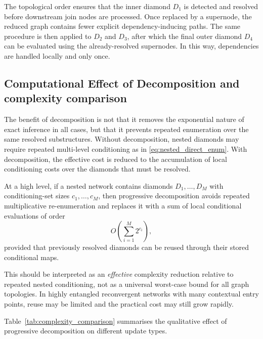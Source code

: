 \documentclass[preprint,12pt]{elsarticle}
\begin{document}
The topological order ensures that the inner diamond $D_1$ is detected and resolved before downstream join nodes are processed. Once replaced by a supernode, the reduced graph contains fewer explicit dependency-inducing paths. The same procedure is then applied to $D_2$ and $D_3$, after which the final outer diamond $D_4$ can be evaluated using the already-resolved supernodes. In this way, dependencies are handled locally and only once.

\subsection{Computational Effect of Decomposition and complexity comparison}

The benefit of decomposition is not that it removes the exponential nature of exact inference in all cases, but that it prevents repeated enumeration over the same resolved substructures. Without decomposition, nested diamonds may require repeated multi-level conditioning as in \eqref{eq:nested_direct_enum}. With decomposition, the effective cost is reduced to the accumulation of local conditioning costs over the diamonds that must be resolved.

At a high level, if a nested network contains diamonds $D_1,\ldots,D_M$ with conditioning-set sizes $c_1,\ldots,c_M$, then progressive decomposition avoids repeated multiplicative re-enumeration and replaces it with a sum of local conditional evaluations of order
\begin{equation}
O\!\left(\sum_{i=1}^{M} 2^{c_i}\right),
\label{eq:decomp_complexity}
\end{equation}
provided that previously resolved diamonds can be reused through their stored conditional maps.

This should be interpreted as an \emph{effective} complexity reduction relative to repeated nested conditioning, not as a universal worst-case bound for all graph topologies. In highly entangled reconvergent networks with many contextual entry points, reuse may be limited and the practical cost may still grow rapidly.


Table~\ref{tab:complexity_comparison} summarises the qualitative effect of progressive decomposition on different update types.
\end{document}
